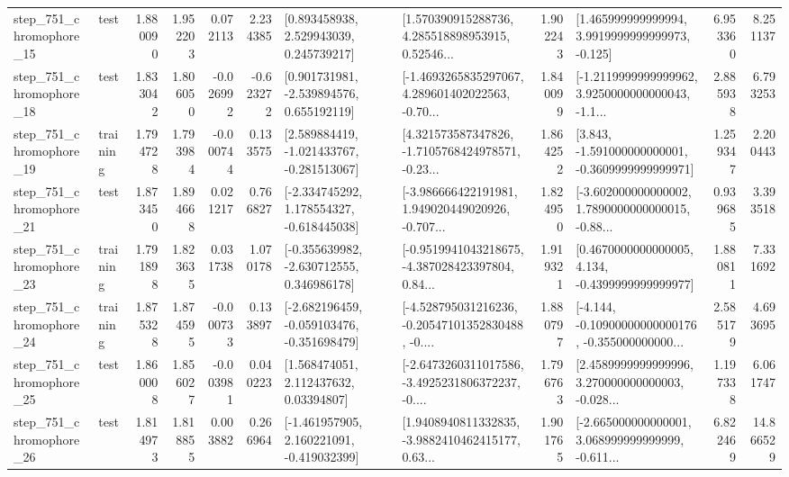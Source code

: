 \begin{tabular}{llrrrrllrlrr}
  step\_751\_chromophore\_15 &      test &      1.880090 &    1.952203 &      0.072113 &  2.234385 &     [0.893458938, 2.529943039, 0.245739217] &  [1.570390915288736, 4.285518898953915, 0.52546... &       1.902243 &    [1.465999999999994, 3.9919999999999973, -0.125] &            6.953360 &          8.251137 \\
  step\_751\_chromophore\_18 &      test &      1.833042 &    1.806050 &     -0.026992 & -0.623272 &    [0.901731981, -2.539894576, 0.655192119] &  [-1.4693265835297067, 4.289601402022563, -0.70... &       1.840099 &  [-1.2119999999999962, 3.9250000000000043, -1.1... &            2.885938 &          6.793253 \\
  step\_751\_chromophore\_19 &  training &      1.794728 &    1.793984 &     -0.000744 &  0.133575 &   [2.589884419, -1.021433767, -0.281513067] &  [4.321573587347826, -1.7105768424978571, -0.23... &       1.864252 &   [3.843, -1.591000000000001, -0.3609999999999971] &            1.259347 &          2.200443 \\
  step\_751\_chromophore\_21 &      test &      1.873450 &    1.894668 &      0.021217 &  0.766827 &   [-2.334745292, 1.178554327, -0.618445038] &  [-3.986666422191981, 1.949020449020926, -0.707... &       1.824950 &  [-3.602000000000002, 1.7890000000000015, -0.88... &            0.939685 &          3.393518 \\
  step\_751\_chromophore\_23 &  training &      1.791898 &    1.823635 &      0.031738 &  1.070178 &   [-0.355639982, -2.630712555, 0.346986178] &  [-0.9519941043218675, -4.387028423397804, 0.84... &       1.919321 &   [0.4670000000000005, 4.134, -0.4399999999999977] &            1.880811 &          7.331692 \\
  step\_751\_chromophore\_24 &  training &      1.875328 &    1.874595 &     -0.000733 &  0.133897 &  [-2.682196459, -0.059103476, -0.351698479] &  [-4.528795031216236, -0.20547101352830488, -0.... &       1.880797 &  [-4.144, -0.10900000000000176, -0.355000000000... &            2.585179 &          4.693695 \\
  step\_751\_chromophore\_25 &      test &      1.860008 &    1.856027 &     -0.003981 &  0.040223 &      [1.568474051, 2.112437632, 0.03394807] &  [-2.6473260311017586, -3.4925231806372237, -0.... &       1.796763 &  [2.4589999999999996, 3.270000000000003, -0.028... &            1.197338 &          6.061747 \\
  step\_751\_chromophore\_26 &      test &      1.814973 &    1.818855 &      0.003882 &  0.266964 &   [-1.461957905, 2.160221091, -0.419032399] &  [1.9408940811332835, -3.9882410462415177, 0.63... &       1.901765 &  [-2.665000000000001, 3.068999999999999, -0.611... &            6.822469 &         14.866529 \\

\end{tabular}
